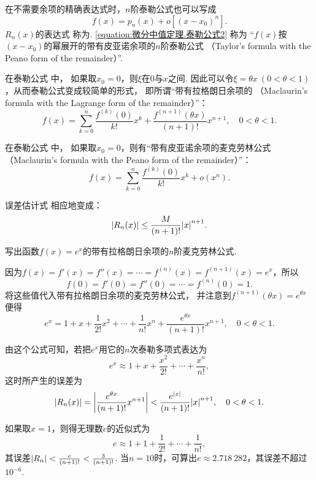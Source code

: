 在不需要余项的精确表达式时，\(n\)阶泰勒公式也可以写成
\begin{equation}\label{equation:微分中值定理.泰勒公式2}
	f(x) = p_n(x) + o[(x - x_0)^n].
\end{equation}
\(R_n(x)\)的表达式  称为.
\cref{equation:微分中值定理.泰勒公式2} 称为
“\(f(x)\)按\((x-x_0)\)的幂展开的带有皮亚诺余项的\(n\)阶泰勒公式
（Taylor's formula with the Peano form of the remainder）”.

在泰勒公式  中，
如果取\(x_0 = 0\)，则\(\xi\)在\(0\)与\(x\)之间.
因此可以令\(\xi = \theta x\ (0 < \theta < 1)\)，从而泰勒公式变成较简单的形式，
即所谓“带有拉格朗日余项的
（Maclaurin's formula with the Lagrange form of the remainder）”：
\begin{equation}\label{equation:微分中值定理.泰勒公式3}
	f(x)=\sum_{k=0}^n \frac{f^{(k)}(0)}{k!} x^k
		+ \frac{f^{(n+1)}(\theta x)}{(n+1)!} x^{n+1},
	\quad 0 < \theta < 1.
\end{equation}

在泰勒公式  中，
如果取\(x_0 = 0\)，则有“带有皮亚诺余项的麦克劳林公式
（Maclaurin's formula with the Peano form of the remainder）”：
\begin{equation}\label{equation:微分中值定理.泰勒公式4}
	f(x)=\sum_{k=0}^n \frac{f^{(k)}(0)}{k!} x^k + o(x^n).
\end{equation}

误差估计式  相应地变成：
\begin{equation}\label{equation:微分中值定理.泰勒公式.误差2}
	\abs{R_n(x)} \leq \frac{M}{(n+1)!} \abs{x}^{n+1}.
\end{equation}

\begin{example}
写出函数\(f(x) = e^x\)的带有拉格朗日余项的\(n\)阶麦克劳林公式.
\begin{solution}
因为\(f(x)=f'(x)=f''(x)=\dotsb=f^{(n)}(x)=f^{(n+1)}(x)=e^x\)，所以\[
	f(0)=f'(0)=f''(0)=\dotsb=f^{(n)}(0)=1.
\]
将这些值代入带有拉格朗日余项的麦克劳林公式，
并注意到\(f^{(n+1)}(\theta x) = e^{\theta x}\)
便得\[%
	e^x = 1 + x + \frac{1}{2!} x^2 + \dotsb
	+ \frac{1}{n!} x^n + \frac{e^{\theta x}}{(n+1)!} x^{n+1},
	\quad 0 < \theta < 1.
\]

由这个公式可知，若把\(e^x\)用它的\(n\)次泰勒多项式表达为\[
	e^x \approx 1 + x + \frac{x^2}{2!} + \dotsb + \frac{x^n}{n!},
\]
这时所产生的误差为\[
	\abs{R_n(x)} = \abs{\frac{e^{\theta x}}{(n+1)!} x^{n+1}}
	< \frac{e^{\abs{x}}}{(n+1)!} \abs{x}^{n+1},
	\quad 0 < \theta < 1.
\]

如果取\(x = 1\)，则得无理数\(e\)的近似式为\[
	e \approx 1 + 1 + \frac{1}{2!} + \dotsb + \frac{1}{n!},
\]
其误差\(\abs{R_n} < \frac{e}{(n+1)!} < \frac{3}{(n+1)!}\).
当\(n=10\)时，可算出\(e \approx 2.718\ 282\)，其误差不超过\(10^{-6}\).
\end{solution}
\end{example}

